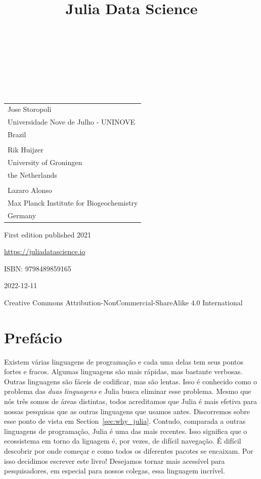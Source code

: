 \documentclass[
  notoc %
]{tufte-book}
\title{Julia Data Science}
\author{\noindent{Jose Storopoli}\\[3mm] \noindent{Rik
Huijzer}\\[3mm] \noindent{Lazaro Alonso}\\[3mm] }
\date{}
\begin{document}
\makeatletter
\thispagestyle{empty}
\vfill
{\Huge\bf
\noindent
\@title
}\\[1in]
{\Large
\noindent
\@author
}
\makeatother

\makeatletter
\newpage
\thispagestyle{empty}
\vfill
{\noindent
\begin{tabular}{l} Jose Storopoli\\ Universidade Nove de Julho - UNINOVE\\ Brazil\\ \\ Rik Huijzer\\ University of Groningen\\ the Netherlands\\ \\ Lazaro Alonso\\ Max Planck Institute for Biogeochemistry\\ Germany \end{tabular}
}
\vfill
{\small
First edition published 2021

\url{https://juliadatascience.io}

ISBN: 9798489859165

2022-12-11

Creative Commons Attribution-NonCommercial-ShareAlike 4.0 International
}
\makeatother


\frontmatter
\mainmatter

\setcounter{tocdepth}{1}
\tableofcontents

\justifying

\setlength{\parindent}{0pt}

\hypertarget{sec:preface}{%
\chapter{Prefácio}\label{sec:preface}}

Existem várias linguagens de programação e cada uma delas tem seus
pontos fortes e fracos. Algumas linguagens são mais rápidas, mas
bastante verbosas. Outras linguagens são fáceis de codificar, mas são
lentas. Isso é conhecido como o problema das \emph{duas linguagens} e
Julia busca eliminar esse problema. Mesmo que nós três somos de áreas
distintas, todos acreditamos que Julia é mais efetiva para nossas
pesquisas que as outras linguagens que usamos antes. Discorremos sobre
esse ponto de vista em Section~\ref{sec:why_julia}. Contudo, comparada a
outras linguagens de programação, Julia é uma das mais recentes. Isso
significa que o ecossistema em torno da liguagem é, por vezes, de
difícil navegação. É difícil descobrir por onde começar e como todos os
diferentes pacotes se encaixam. Por isso decidimos escrever este livro!
Desejamos tornar mais acessível para pesquisadores, em especial para
nossos colegas, essa linguagem incrível.
\end{document}
